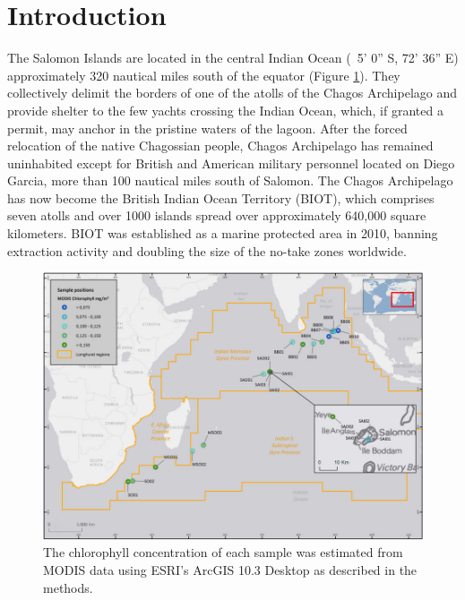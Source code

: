 \section{Introduction}

The Salomon Islands are located in the central Indian Ocean (~5' 0'' S, 72' 36'' E) approximately 320 nautical miles south of the equator (Figure \ref{Chagos_fig1}). They collectively delimit the borders of one of the atolls of the Chagos Archipelago and provide shelter to the few yachts crossing the Indian Ocean, which, if granted a permit, may anchor in the pristine waters of the lagoon. After the forced relocation of the native Chagossian people, Chagos Archipelago has remained uninhabited except for British and American military personnel located on Diego Garcia, more than 100 nautical miles south of Salomon. The Chagos Archipelago has now become the British Indian Ocean Territory (BIOT), which comprises seven atolls and over 1000 islands spread over approximately 640,000 square kilometers. BIOT was established as a marine protected area in 2010, banning extraction activity and doubling the size of the no-take zones worldwide.

\begin{figure}
    \centering
    \includegraphics{Chagos/figures/fig1}
    \caption{The chlorophyll concentration of each sample was estimated from MODIS data using ESRI's ArcGIS 10.3 Desktop as described in the methods.}
    \label{Chagos_fig1}
\end{figure}

